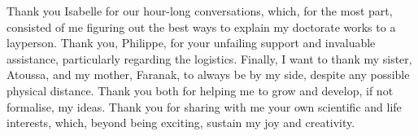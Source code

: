 Thank you Isabelle for our hour-long conversations,
which, for the most part, consisted of me figuring out the best ways
to explain my doctorate works to a layperson.
Thank you, Philippe, for your unfailing support and invaluable assistance,
particularly regarding the logistics.
Finally, I want to thank my sister, Atoussa, and my mother, Faranak,
to always be by my side, despite any possible physical distance.
Thank you both for helping me to grow and develop,
if not formalise, my ideas.
Thank you for sharing with me your own scientific and life interests,
which, beyond being exciting, sustain my joy and creativity.


